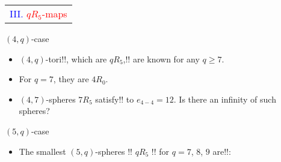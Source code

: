 \documentclass[%
pdf,
colorBG,
slideColor,
]{prosper}
\begin{document}
\begin{slide}{}
\begin{center}
{\Huge 
\begin{tabular*}{7cm}{c}
\\[-0.5cm]
\textcolor{blue}{III. }\textcolor{red}{$qR_5$-maps}
\end{tabular*}
}
\end{center}
\end{slide}


\begin{slide}{$(4,q)$-case}
\begin{itemize}
\item $(4,q)$-tori!!, which are $qR_5$,!! are known for any $q\geq 7$.
\item For $q=7$, they are $4R_0$.
\item $(4,7)$-spheres $7R_5$ satisfy!! to $e_{4-4}=12$. Is there an 
infinity of such spheres?
\begin{center}
\begin{minipage}{3.5cm}
\centering
{}\par
\end{minipage}
\end{center}

\end{itemize}
\end{slide}




\begin{slide}{$(5,q)$-case}
\vspace{-3mm}
\begin{itemize}
\item The smallest $(5,q)$-spheres 
!!%
$qR_5$ 
!!%
for $q=7$, $8$, $9$ are!!:
\begin{center}
\begin{minipage}{4.0cm}
\centering
{}\par
\end{minipage}
\hspace{2.0cm}
\begin{minipage}{4.0cm}
\centering
{}\par
\end{minipage}
\end{center}
\vspace{-17mm}
\begin{center}
\begin{minipage}{4.0cm}
\centering
{}\par
\end{minipage}
\end{center}

\end{itemize}
\end{slide}
\end{document}
